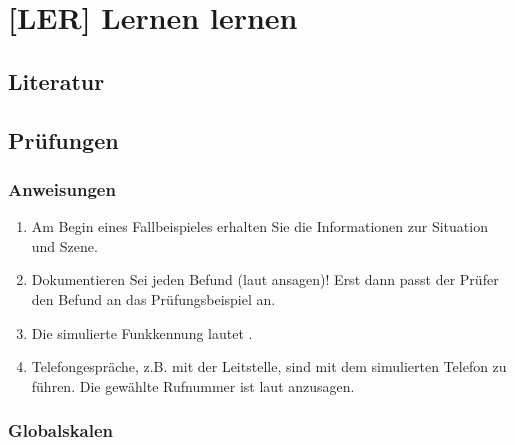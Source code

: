\chapter{[LER] Lernen lernen}

\section{Literatur}

\section{Prüfungen}

\subsection{Anweisungen}

\begin{enumerate}
  \item Am Begin eines Fallbeispieles erhalten Sie die Informationen zur
  Situation und Szene.
  \item Dokumentieren Sei jeden Befund (laut ansagen)! Erst dann passt der
  Prüfer den Befund an das Prüfungsbeispiel an.
  \item Die simulierte Funkkennung lautet \gTakeNotesMedium . 
  \item Telefongespräche, z.B. mit der Leitstelle, sind mit dem simulierten
  Telefon zu führen. Die gewählte Rufnummer ist laut anzusagen.
\end{enumerate}

\subsection{Globalskalen}

